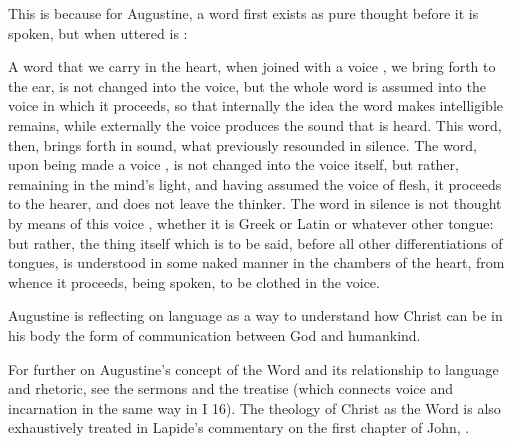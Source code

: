 This is because for Augustine, a word first exists as pure thought before it is
spoken, but when uttered is :
\begin{quoting}
    A word  that we carry in the heart, when
    joined with a voice , we bring
    forth to the ear, is not changed into the voice, but the whole word is
    assumed into the voice in which it proceeds, so that internally the idea the
    word makes intelligible remains, while externally the voice produces the
    sound that is heard.
    This word, then, brings forth in sound, what previously resounded in
    silence.  The word, upon being made a voice , is
    not changed into the voice itself, but rather, remaining in the mind's
    light, and having assumed the voice  of flesh, it proceeds to
    the hearer, and does not leave the thinker.
    The word in silence is not thought by means of this voice ,
    whether it is Greek or Latin or whatever other tongue: but rather, the thing
    itself which is to be said, before all other differentiations of tongues, is
    understood in some naked manner in the chambers of the heart, from whence it
    proceeds, being spoken, to be clothed in the voice.%
    \Autocite
    [1002, Sermo 187, In Natali Domini 4: .] 
    {Augustine:SermonesPL}
\end{quoting}
Augustine is reflecting on language as a way to understand how Christ can be in
his body the form of communication between God and
humankind.%
\begin{Footnote}
    For further on Augustine's concept of the Word and its relationship to
    language and rhetoric, see the sermons  and the
    treatise  (which connects voice and
    incarnation in the same way in I 16).
    The theology of Christ as the Word is also exhaustively treated in Lapide's
    commentary on the first chapter of John,
    \autocite[872--889]{Lapide:Gospels19C}.
\end{Footnote}

